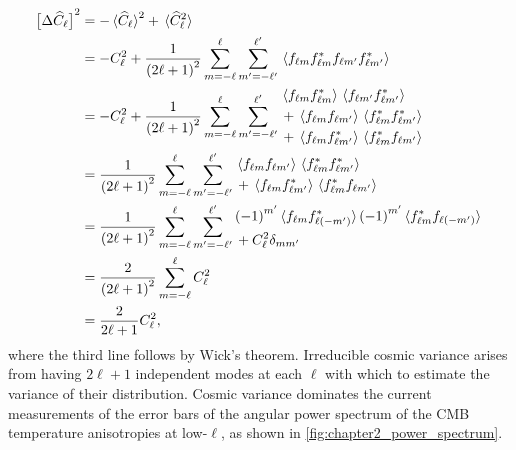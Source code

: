 \begin{align}
    \variance{\powerSpectrumHat}
     & = - \expval*{\powerSpectrumHat}^{2} + \expval*{\powerSpectrumHat^{2}} \nonumber{}                                                                                                                     \\
     & = - \powerSpectrum^{2} + \frac{1}{{(2\ell+1)}^{2}} \sum\limits_{m=-\ell}^{\ell} \sum\limits_{m'=-\ell'}^{\ell'} \expval*{\harmonic{f} \conj{\harmonic{f}} f_{\ell m'} \conj{f_{\ell m'}}} \nonumber{} \\
     & = - \powerSpectrum^{2} + \frac{1}{{(2\ell+1)}^{2}} \sum\limits_{m=-\ell}^{\ell} \sum\limits_{m'=-\ell'}^{\ell'}
    \begin{aligned}
         & \expval*{\harmonic{f} \conj{\harmonic{f}}}  \expval*{f_{\ell m'} \conj{f_{\ell m'}}} \nonumber{}  \\
         & + \expval*{\harmonic{f} f_{\ell m'}} \expval*{\conj{\harmonic{f}} \conj{f_{\ell m'}}} \nonumber{} \\
         & + \expval*{\harmonic{f} \conj{f_{\ell m'}}} \expval*{\conj{\harmonic{f}} f_{\ell m'}}
    \end{aligned} \nonumber{}                                          \\
     & = \frac{1}{{(2\ell+1)}^{2}} \sum\limits_{m=-\ell}^{\ell} \sum\limits_{m'=-\ell'}^{\ell'}
    \begin{aligned}
         & \expval*{\harmonic{f} f_{\ell m'}} \expval*{\conj{\harmonic{f}} \conj{f_{\ell m'}}} \nonumber{} \\
         & + \expval*{\harmonic{f} \conj{f_{\ell m'}}} \expval*{\conj{\harmonic{f}} f_{\ell m'}}
    \end{aligned} \nonumber{}                                                                \\
     & = \frac{1}{{(2\ell+1)}^{2}} \sum\limits_{m=-\ell}^{\ell} \sum\limits_{m'=-\ell'}^{\ell'}
    \begin{aligned}
         & \phaseFactor['] \expval*{\harmonic{f} \conj{f_{\ell(-m')}}} \phaseFactor['] \expval*{\conj{\harmonic{f}} f_{\ell(-m')}} \nonumber{} \\
         & + \powerSpectrum^{2} \delta_{m m'}
    \end{aligned} \nonumber{}                                \\
     & = \frac{2}{{(2\ell+1)}^{2}} \sum\limits_{m=-\ell}^{\ell} \powerSpectrum^{2} \nonumber{}                                                                                                               \\
     & = \frac{2}{2\ell+1} \powerSpectrum^{2},
\end{align}
%
where the third line follows by Wick's theorem.
Irreducible cosmic variance arises from having \(2\ell+1\) independent modes at each \(\ell{}\) with which to estimate the variance of their distribution.
Cosmic variance dominates the current measurements of the error bars of the angular power spectrum of the CMB temperature anisotropies at low-\(\ell{}\), as shown in \cref{fig:chapter2_power_spectrum}.

